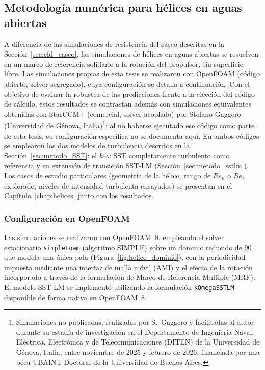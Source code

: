 \subsection{Metodología numérica para hélices en aguas abiertas}
\label{sec:metodologia_helices}

A diferencia de las simulaciones de resistencia del casco descritas en la
Sección~\ref{sec:cfd_casco}, las simulaciones de hélices en aguas abiertas se
resuelven en un marco de referencia solidario a la rotación del propulsor, sin
superficie libre. Las simulaciones propias de esta tesis se realizaron con
OpenFOAM (código abierto, solver segregado), cuya configuración se detalla a
continuación. Con el objetivo de evaluar la robustez de las predicciones frente a
la elección del código de cálculo, estos resultados se contrastan además con
simulaciones equivalentes obtenidas con StarCCM+ (comercial, solver acoplado) por
Stefano Gaggero (Universidad de Génova, Italia)\footnote{Simulaciones no publicadas, realizadas por S.~Gaggero y facilitadas al autor durante su estadía de investigación en el Departamento de Ingeniería Naval, Eléctrica, Electrónica y de Telecomunicaciones (DITEN) de la Universidad de Génova, Italia, entre noviembre de 2025 y febrero de 2026, financiada por una beca UBAINT Doctoral de la Universidad de Buenos Aires.}; al no
haberse ejecutado ese código como parte de esta tesis, su configuración
específica no se documenta aquí. En ambos códigos se emplearon los dos modelos de
turbulencia descritos en la Sección~\ref{sec:metodo_SST}: el $k$--$\omega$ SST
completamente turbulento como referencia y su extensión de transición SST-LM
(Sección~\ref{sec:metodo_sstlm}). Los casos de estudio particulares (geometría de
la hélice, rango de $Re_n$ o $Re_c$ explorado, niveles de intensidad turbulenta
ensayados) se presentan en el Capítulo~\ref{chap:helices} junto con los
resultados.

\subsubsection{Configuración en OpenFOAM}
\label{sec:metodologia_helices_openfoam}

Las simulaciones se realizaron con OpenFOAM~8, empleando el solver
estacionario \texttt{simpleFoam} (algoritmo SIMPLE) sobre un dominio reducido de
$90^\circ$ que modela una única pala (Figura~\ref{fig:helice_dominio}), con la
periodicidad impuesta mediante una interfaz de malla móvil (AMI) y el efecto de la rotación incorporado a través de la
formulación de Marco de Referencia Múltiple (MRF). El modelo SST-LM se implementó
utilizando la formulación \texttt{kOmegaSSTLM} disponible de forma nativa en
OpenFOAM~8.

